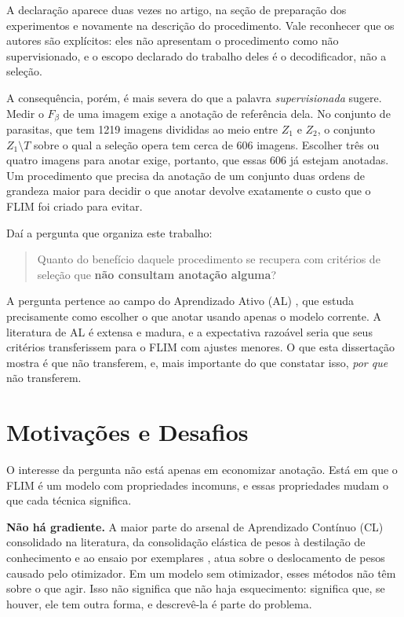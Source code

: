 A declaração aparece duas vezes no artigo, na seção de preparação dos experimentos e novamente na descrição do procedimento. Vale reconhecer que os autores são explícitos: eles não apresentam o procedimento como não supervisionado, e o escopo declarado do trabalho deles é o decodificador, não a seleção.

A consequência, porém, é mais severa do que a palavra \emph{supervisionada} sugere. Medir o $F_\beta$ de uma imagem exige a anotação de referência dela. No conjunto de parasitas, que tem 1219 imagens divididas ao meio entre $Z_1$ e $Z_2$, o conjunto $Z_1 \setminus T$ sobre o qual a seleção opera tem cerca de 606 imagens. Escolher três ou quatro imagens para anotar exige, portanto, que essas 606 já estejam anotadas. Um procedimento que precisa da anotação de um conjunto duas ordens de grandeza maior para decidir o que anotar devolve exatamente o custo que o \ac{FLIM} foi criado para evitar.

Daí a pergunta que organiza este trabalho:

\begin{quote}
Quanto do benefício daquele procedimento se recupera com critérios de seleção que \textbf{não consultam anotação alguma}?
\end{quote}

A pergunta pertence ao campo do Aprendizado Ativo (\ac{AL}) \cite{settles2009active}, que estuda precisamente como escolher o que anotar usando apenas o modelo corrente. A literatura de \ac{AL} é extensa e madura, e a expectativa razoável seria que seus critérios transferissem para o \ac{FLIM} com ajustes menores. O que esta dissertação mostra é que não transferem, e, mais importante do que constatar isso, \emph{por que} não transferem.

\section{Motivações e Desafios}

O interesse da pergunta não está apenas em economizar anotação. Está em que o \ac{FLIM} é um modelo com propriedades incomuns, e essas propriedades mudam o que cada técnica significa.

\textbf{Não há gradiente.} A maior parte do arsenal de Aprendizado Contínuo (\ac{CL}) consolidado na literatura, da consolidação elástica de pesos \cite{kirkpatrick2017overcoming} à destilação de conhecimento \cite{hinton2015distilling} e ao ensaio por exemplares \cite{rebuffi2017icarl}, atua sobre o deslocamento de pesos causado pelo otimizador. Em um modelo sem otimizador, esses métodos não têm sobre o que agir. Isso não significa que não haja esquecimento: significa que, se houver, ele tem outra forma, e descrevê-la é parte do problema.

